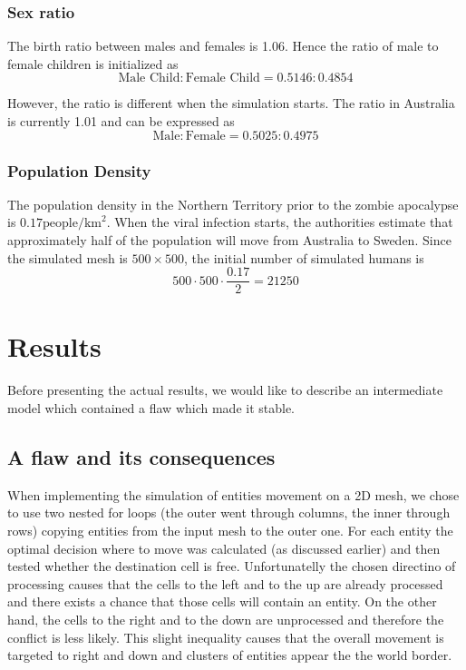 \documentclass[a4paper]{article}
\begin{document}
\subsubsection{Sex ratio}

The birth ratio between males and females is 1.06. \cite{cia}
Hence the ratio of male to female children is initialized as
$$ \text{Male Child} : \text{Female Child} = 0.5146 : 0.4854 $$

However, the ratio is different when the simulation starts.
The ratio in Australia is currently 1.01 and can be expressed as \cite{cia}
$$ \text{Male} : \text{Female} = 0.5025 : 0.4975 $$

\subsubsection{Population Density}

The population density in the Northern Territory prior to the zombie apocalypse is $0.17\text{people}/\text{km}^2$. \cite{northernterritory}
When the viral infection starts, the authorities estimate that approximately half of the population will move from Australia to Sweden. \cite{project}
Since the simulated mesh is $500 \times 500$, the initial number of simulated humans is
$$ 500 \cdot 500 \cdot \frac{0.17}{2} = 21250 $$

\section{Results}

Before presenting the actual results, we would like to describe an intermediate model which contained a flaw which made it stable.

\subsection{A flaw and its consequences}

When implementing the simulation of entities movement on a 2D mesh, we chose to use two nested for loops (the outer went through columns, the inner through rows) copying entities from the input mesh to the outer one.
For each entity the optimal decision where to move was calculated (as discussed earlier) and then tested whether the destination cell is free.
Unfortunatelly the chosen directino of processing causes that the cells to the left and to the up are already processed and there exists a chance that those cells will contain an entity.
On the other hand, the cells to the right and to the down are unprocessed and therefore the conflict is less likely.
This slight inequality causes that the overall movement is targeted to right and down and clusters of entities appear the the world border.
\end{document}
